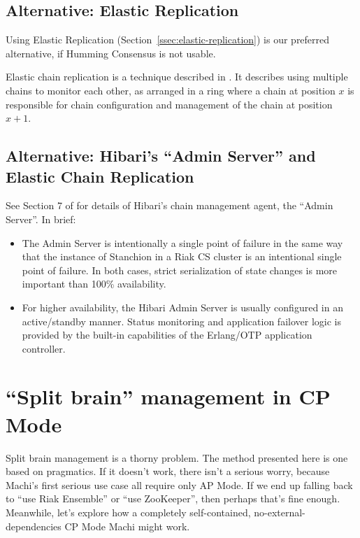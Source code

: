 \documentclass[preprint,10pt]{sigplanconf}
\begin{document}
\subsection{Alternative: Elastic Replication}

Using Elastic Replication (Section~\ref{ssec:elastic-replication}) is
our preferred alternative, if Humming Consensus is not usable.

Elastic chain replication is a technique described in
\cite{elastic-chain-replication}.  It describes using multiple chains
to monitor each other, as arranged in a ring where a chain at position
$x$ is responsible for chain configuration and management of the chain
at position $x+1$.

\subsection{Alternative: Hibari's ``Admin Server''
  and Elastic Chain Replication}

See Section 7 of \cite{cr-theory-and-practice} for details of Hibari's
chain management agent, the ``Admin Server''.  In brief:

\begin{itemize}
\item The Admin Server is intentionally a single point of failure in
  the same way that the instance of Stanchion in a Riak CS cluster
  is an intentional single
  point of failure.  In both cases, strict
  serialization of state changes is more important than 100\%
  availability.

\item For higher availability, the Hibari Admin Server is usually
  configured in an active/standby manner.  Status monitoring and
  application failover logic is provided by the built-in capabilities
  of the Erlang/OTP application controller.

\end{itemize}

\section{``Split brain'' management in CP Mode}
\label{sec:split-brain-management}

Split brain management is a thorny problem.  The method presented here
is one based on pragmatics.  If it doesn't work, there isn't a serious
worry, because Machi's first serious use case all require only AP Mode.
If we end up falling back to ``use Riak Ensemble'' or ``use ZooKeeper'',
then perhaps that's
fine enough.  Meanwhile, let's explore how a
completely self-contained, no-external-dependencies
CP Mode Machi might work.
\end{document}
